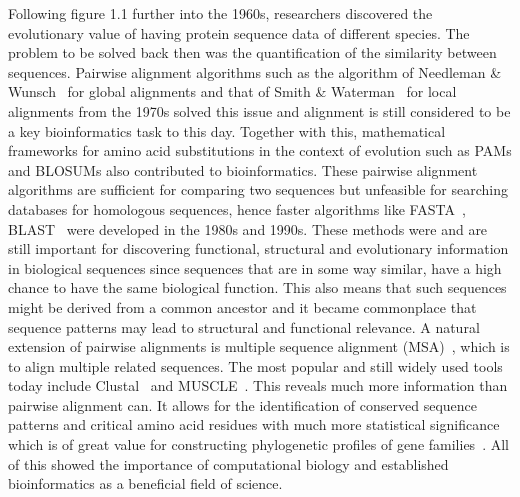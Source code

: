 Following figure 1.1 further into the 1960s, researchers discovered the evolutionary value of having protein sequence data of different species. The problem to be solved back then was the quantification of the similarity between sequences. Pairwise alignment algorithms such as the algorithm of Needleman \& Wunsch~\cite{global} for global alignments and that of Smith \& Waterman~\cite{local} for local alignments from the 1970s solved this issue and alignment is still considered to be a key bioinformatics task to this day. Together with this, mathematical frameworks for amino acid substitutions in the context of evolution such as PAMs and BLOSUMs also contributed to bioinformatics. These pairwise alignment algorithms are sufficient for comparing two sequences but unfeasible for searching databases for homologous sequences, hence faster algorithms like FASTA~\cite{fasta}, BLAST~\cite{blast} were developed in the 1980s and 1990s. These methods were and are still important for discovering functional, structural and evolutionary information in biological sequences since sequences that are in some way similar, have a high chance to have the same biological function. This also means that such sequences might be derived from a common ancestor and it became commonplace that sequence patterns may lead to structural and functional relevance. A natural extension of pairwise alignments is multiple sequence alignment (MSA)~\cite{msa}, which is to align multiple related sequences. The most popular and still widely used tools today include Clustal~\cite{clustal} and MUSCLE~\cite{muscle}. This reveals much more information than pairwise alignment can. It allows for the identification of conserved sequence patterns and critical amino acid residues with much more statistical significance which is of great value for constructing phylogenetic profiles of gene families~\cite{phylo}. All of this showed the importance of computational biology and established bioinformatics as a beneficial field of science.

